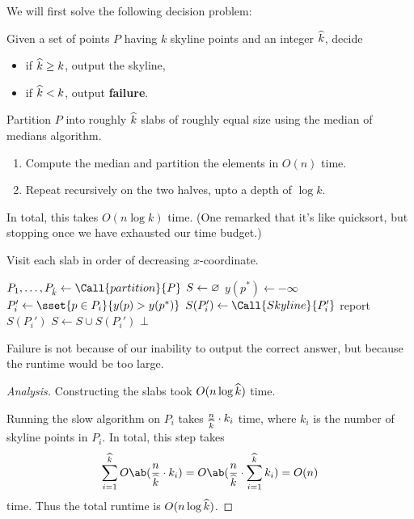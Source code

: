 We will first solve the following decision problem:
\begin{question*}
    Given a set of points $P$ having $k$ skyline points and an integer
    $\widehat{k}$, decide
    \begin{itemize}
        \item if $\widehat{k} \ge k$, output the skyline,
        \item if $\widehat{k} < k$, output \textbf{failure}.
    \end{itemize}
\end{question*}
\begin{solution}
    Partition $P$ into roughly $\widehat{k}$ slabs of roughly equal size
    using the median of medians algorithm.
    \begin{enumerate}
        \item Compute the median and partition the elements in $O(n)$ time.
        \item Repeat recursively on the two halves, upto a depth of
            $\log k$.
    \end{enumerate}
    In total, this takes $O(n \log k)$ time.
    (One remarked that it's like quicksort, but stopping once we have
    exhausted our time budget.)

    Visit each slab in order of decreasing $x$-coordinate.
    \begin{algo}[.7]
            \State $P_1, \ldots, P_{\hat{k}} \gets \Call{partition}{P}$
            \State $S \gets \varnothing$
            \State $y(p^*) \gets -\infty$
                \State $P_i' \gets \sset{p \in P_i}{y(p) > y(p^*)}$
                \State $S(P_i') \gets \Call{Skyline}{P_i'}$
                \State report $S(P_i')$
                \State $S \gets S \cup S(P_i')$
                    \State \Return $\bot$
                \EndIf
            \EndFor
        \EndFn
    \end{algo}
    Failure is not because of our inability to output the correct answer,
    but because the runtime would be too large.
\end{solution}
\begin{proof}[Analysis]
    Constructing the slabs took $O(n \log \widehat{k})$ time.

    Running the slow algorithm on $P_i$ takes $\frac{n}{\widehat{k}} \cdot k_i$
    time, where $k_i$ is the number of skyline points in $P_i$.
    In total, this step takes \[
        \sum_{i=1}^{\what{k}} O\ab(\frac{n}{\what{k}} \cdot k_i)
            = O\ab(\frac{n}{\what{k}} \cdot \sum_{i=1}^{\what{k}} k_i)
            = O(n)
    \] time.
    Thus the total runtime is $O(n \log \widehat{k})$.
\end{proof}

